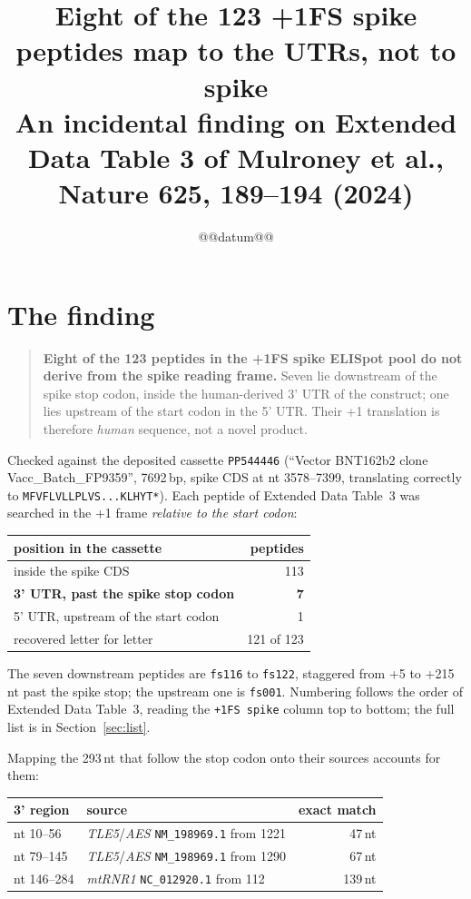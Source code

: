 \documentclass[11pt,a4paper]{article}
\title{\textbf{Eight of the 123 +1FS spike peptides map to the UTRs,
not to spike}\\[2mm]
\large An incidental finding on Extended Data Table 3 of Mulroney et al.,
Nature 625, 189--194 (2024)}
\author{}
\date{@@datum@@}
\begin{document}
\maketitle
\thispagestyle{plain}

\section*{The finding}

\begin{quote}
\textbf{Eight of the 123 peptides in the +1FS spike ELISpot pool do not derive
from the spike reading frame.} Seven lie downstream of the spike stop codon,
inside the human-derived 3' UTR of the construct; one lies upstream of the
start codon in the 5' UTR. Their +1 translation is therefore \emph{human}
sequence, not a novel product.
\end{quote}

Checked against the deposited cassette \texttt{PP544446} (``Vector BNT162b2
clone Vacc\_Batch\_FP9359'', 7692\,bp, spike CDS at nt 3578--7399, translating
correctly to \texttt{MFVFLVLLPLVS...KLHYT*}). Each peptide of Extended Data
Table~3 was searched in the +1 frame \emph{relative to the start codon}:

\begin{center}
\begin{tabular}{lr}
\toprule
position in the cassette & peptides \\
\midrule
inside the spike CDS & 113 \\
\textbf{3' UTR, past the spike stop codon} & \textbf{7} \\
5' UTR, upstream of the start codon & 1 \\
\midrule
recovered letter for letter & 121 of 123 \\
\bottomrule
\end{tabular}
\end{center}

The seven downstream peptides are \texttt{fs116} to \texttt{fs122}, staggered
from +5 to +215\,nt past the spike stop; the upstream one is \texttt{fs001}.
Numbering follows the order of Extended Data Table~3, reading the
\texttt{+1FS spike} column top to bottom; the full list is in
Section~\ref{sec:list}.

Mapping the 293\,nt that follow the stop codon onto their sources accounts for
them:

\begin{center}
\begin{tabular}{llr}
\toprule
3' region & source & exact match \\
\midrule
nt 10--56 & \emph{TLE5}/\emph{AES} \texttt{NM\_198969.1} from 1221 & 47\,nt \\
nt 79--145 & \emph{TLE5}/\emph{AES} \texttt{NM\_198969.1} from 1290 & 67\,nt \\
nt 146--284 & \emph{mtRNR1} \texttt{NC\_012920.1} from 112 & 139\,nt \\
\bottomrule
\end{tabular}
\end{center}
\end{document}
